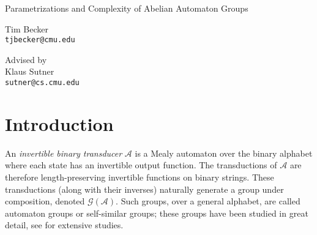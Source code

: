 \documentclass[12pt, letterpaper]{article}
\newcommand{\A}{\mathcal A}
\newcommand{\gp}{\mathcal G}
\begin{document}
\thispagestyle{empty}
\vspace*{\fill}
\begin{center}
    {\Huge Parametrizations and Complexity of Abelian Automaton Groups}
    \vspace{1in}

    {\Large Tim Becker\hfill\\}
    \texttt{tjbecker@cmu.edu}

    \vspace{1in}

    {\large Advised by}\\
    {\Large Klaus Sutner\hfill\\}
    \texttt{sutner@cs.cmu.edu}
\end{center}
\vspace*{\fill}

\pagebreak
\thispagestyle{empty}


\pagebreak
\thispagestyle{empty}

\tableofcontents

\pagebreak
\setcounter{page}{1}

\section{Introduction}
An \emph{invertible binary transducer} $\A$ is a Mealy automaton over the
binary alphabet where each state has an invertible output function. The
transductions of $\A$ are therefore length-preserving invertible functions on
binary strings. These transductions (along with their inverses) naturally
generate a group under composition, denoted $\gp(\A)$. Such groups, over a
general alphabet, are called automaton groups or self-similar groups; these
groups have been studied in great detail, see \cite{nekrashevych2014self,
    grigorchuk2000automata} for extensive studies.
\end{document}
